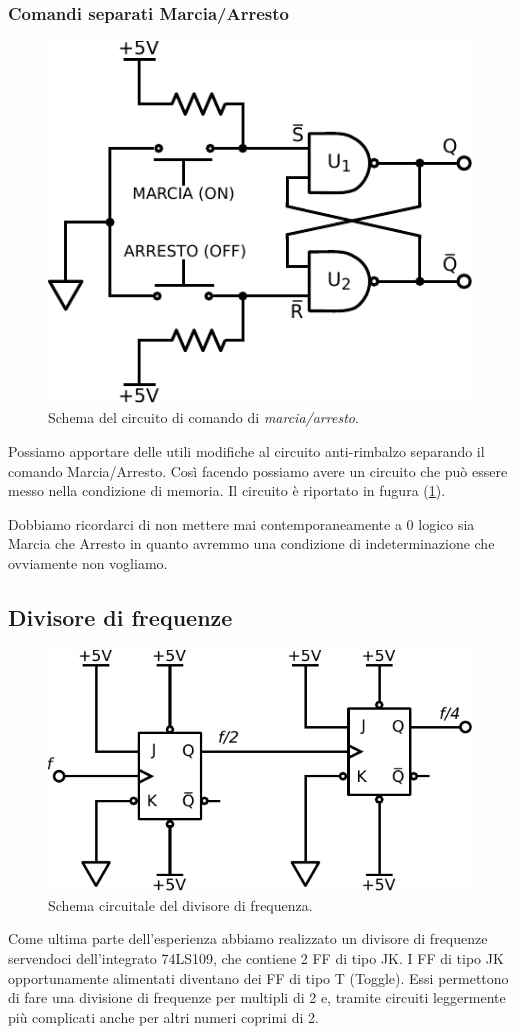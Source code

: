 \subsubsection*{Comandi separati Marcia/Arresto}

\begin{figure}[H]
	\centering
	\includegraphics[width=.25\textwidth]{../E11/latex/motorefermo.pdf}
	\caption{Schema del circuito di comando di \textit{marcia/arresto}.}
	\label{cir11:marcia}
\end{figure}

Possiamo apportare delle utili modifiche al circuito anti-rimbalzo separando il comando Marcia/Arresto.
Così facendo possiamo avere un circuito che può essere messo nella condizione di memoria.
Il circuito è riportato in fugura (\ref{cir11:marcia}).

Dobbiamo ricordarci di non mettere mai contemporaneamente a 0 logico sia Marcia che Arresto in quanto avremmo una condizione di indeterminazione che ovviamente non vogliamo.

\subsection{Divisore di frequenze}

\begin{figure}
	\centering
	\includegraphics[width=.35\textwidth]{../E11/latex/frequency-divider.pdf}
	\caption{Schema circuitale del divisore di frequenza.}
	\label{cir11:freq-div}
\end{figure}

Come ultima parte dell'esperienza abbiamo realizzato un divisore di frequenze servendoci dell'integrato 74LS109, che contiene 2 FF di tipo JK.
I FF di tipo JK opportunamente alimentati diventano dei FF di tipo T (Toggle).
Essi permettono di fare una divisione di frequenze per multipli di 2 e, tramite circuiti leggermente più complicati anche per altri numeri coprimi di 2.

